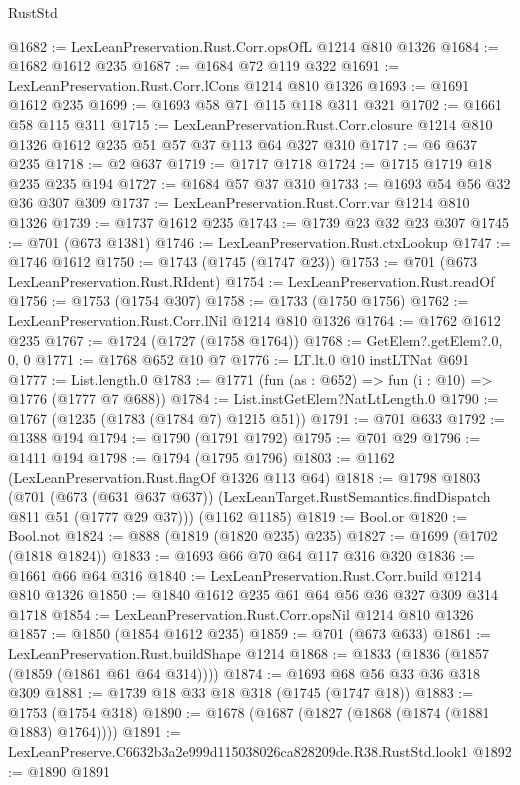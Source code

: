 \begin{lexlean}{RustStd}
\begin{coremodule}
@1682 := LexLeanPreservation.Rust.Corr.opsOfL @1214 @810 @1326
@1684 := @1682 @1612 @235
@1687 := @1684 @72 @119 @322
@1691 := LexLeanPreservation.Rust.Corr.lCons @1214 @810 @1326
@1693 := @1691 @1612 @235
@1699 := @1693 @58 @71 @115 @118 @311 @321
@1702 := @1661 @58 @115 @311
@1715 := LexLeanPreservation.Rust.Corr.closure
    @1214
    @810
    @1326
    @1612
    @235
    @51
    @57
    @37
    @113
    @64
    @327
    @310
@1717 := @6 @637 @235
@1718 := @2 @637
@1719 := @1717 @1718
@1724 := @1715 @1719 @18 @235 @235 @194
@1727 := @1684 @57 @37 @310
@1733 := @1693 @54 @56 @32 @36 @307 @309
@1737 := LexLeanPreservation.Rust.Corr.var @1214 @810 @1326
@1739 := @1737 @1612 @235
@1743 := @1739 @23 @32 @23 @307
@1745 := @701 (@673 @1381)
@1746 := LexLeanPreservation.Rust.ctxLookup
@1747 := @1746 @1612
@1750 := @1743 (@1745 (@1747 @23))
@1753 := @701 (@673 LexLeanPreservation.Rust.RIdent)
@1754 := LexLeanPreservation.Rust.readOf
@1756 := @1753 (@1754 @307)
@1758 := @1733 (@1750 @1756)
@1762 := LexLeanPreservation.Rust.Corr.lNil @1214 @810 @1326
@1764 := @1762 @1612 @235
@1767 := @1724 (@1727 (@1758 @1764))
@1768 := GetElem?.getElem?.{0, 0, 0}
@1771 := @1768 @652 @10 @7
@1776 := LT.lt.{0} @10 instLTNat @691
@1777 := List.length.{0}
@1783 := @1771 (fun (as : @652) => fun (i : @10) => @1776 (@1777 @7 @688))
@1784 := List.instGetElem?NatLtLength.{0}
@1790 := @1767 (@1235 (@1783 (@1784 @7) @1215 @51))
@1791 := @701 @633
@1792 := @1388 @194
@1794 := @1790 (@1791 @1792)
@1795 := @701 @29
@1796 := @1411 @194
@1798 := @1794 (@1795 @1796)
@1803 := @1162 (LexLeanPreservation.Rust.flagOf @1326 @113 @64)
@1818 := @1798
    @1803
    (@701
      (@673 (@631 @637 @637))
      (LexLeanTarget.RustSemantics.findDispatch @811 @51 (@1777 @29 @37)))
    (@1162 @1185)
@1819 := Bool.or
@1820 := Bool.not
@1824 := @888 (@1819 (@1820 @235) @235)
@1827 := @1699 (@1702 (@1818 @1824))
@1833 := @1693 @66 @70 @64 @117 @316 @320
@1836 := @1661 @66 @64 @316
@1840 := LexLeanPreservation.Rust.Corr.build @1214 @810 @1326
@1850 := @1840 @1612 @235 @61 @64 @56 @36 @327 @309 @314 @1718
@1854 := LexLeanPreservation.Rust.Corr.opsNil @1214 @810 @1326
@1857 := @1850 (@1854 @1612 @235)
@1859 := @701 (@673 @633)
@1861 := LexLeanPreservation.Rust.buildShape @1214
@1868 := @1833 (@1836 (@1857 (@1859 (@1861 @61 @64 @314))))
@1874 := @1693 @68 @56 @33 @36 @318 @309
@1881 := @1739 @18 @33 @18 @318 (@1745 (@1747 @18))
@1883 := @1753 (@1754 @318)
@1890 := @1678 (@1687 (@1827 (@1868 (@1874 (@1881 @1883) @1764))))
@1891 := LexLeanPreserve.C6632b3a2e999d115038026ca828209de.R38.RustStd.look1
@1892 := @1890 @1891

\end{coremodule}
\end{lexlean}
